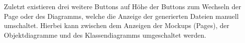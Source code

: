 
Zuletzt existieren drei weitere Buttons auf Höhe der Buttons zum Wechseln der Page oder des Diagramms, welche die Anzeige der generierten Dateien manuell umschaltet.
Hierbei kann zwischen dem Anzeigen der Mockups (Pages), der Objektdiagramme und des Klassendiagramms umgeschaltet werden.
